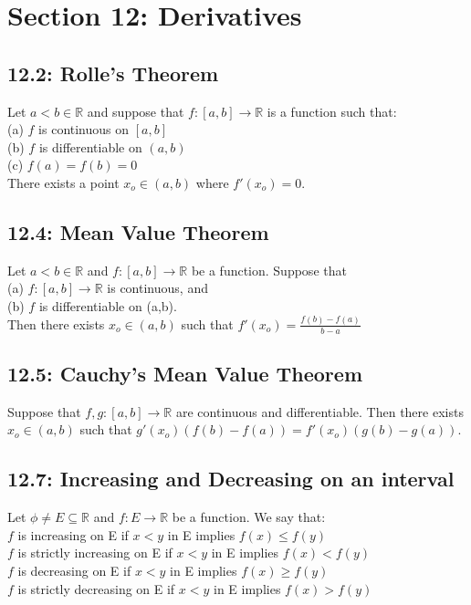 \documentclass[10pt,letter]{report}
\begin{document}
\chapter*{Section 12: Derivatives}

\section*{12.2: Rolle's Theorem}
Let $a<b\in\mathbb{R}$ and suppose that $f:[a,b]\rightarrow\mathbb{R}$ is a function such that: \\ 
(a) $f$ is continuous on $[a,b]$ \\ 
(b) $f$ is differentiable on $(a,b)$\\ 
(c) $f(a) =f(b)=0$\\ 
There exists a point $x_o\in(a,b)$ where $f'(x_o)=0$. 

\section*{12.4: Mean Value Theorem}
Let $a<b\in\mathbb{R}$ and $f:[a,b]\rightarrow\mathbb{R}$ be a function. Suppose that \\ 
(a) $f:[a,b]\rightarrow\mathbb{R}$ is continuous, and \\ 
(b) $f$ is differentiable on (a,b). \\ 
Then there exists $x_o\in(a,b)$ such that $f'(x_o)=\frac{f(b)-f(a)}{b-a}$

\section*{12.5: Cauchy's Mean Value Theorem}
Suppose that $f,g:[a,b]\rightarrow\mathbb{R}$ are continuous and differentiable. Then there exists $x_o\in(a,b)$ such that $g'(x_o)(f(b)-f(a))=f'(x_o)(g(b)-g(a))$. 

\section*{12.7: Increasing and Decreasing on an interval}
Let $\phi\neq E\subseteq\mathbb{R}$ and $f:E\rightarrow\mathbb{R}$ be a function. We say that: \\ 
$f$  is increasing on E if $x<y$ in E implies $f(x)\leq f(y)$\\
$f$  is strictly increasing on E if $x<y$ in E implies $f(x)< f(y)$\\
$f$  is decreasing on E if $x<y$ in E implies $f(x)\geq f(y)$\\
$f$  is strictly decreasing on E if $x<y$ in E implies $f(x)> f(y)$\\ 
\end{document}
